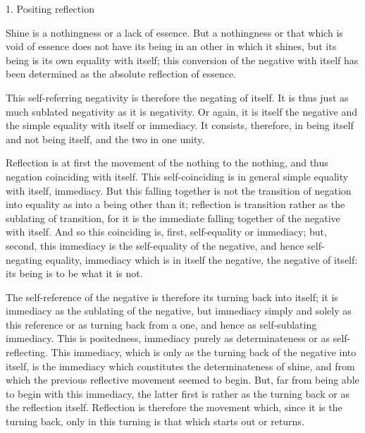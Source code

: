 1. Positing reflection

Shine is a nothingness or a lack of essence.
But a nothingness or that which is void of essence
does not have its being in an other in which it shines,
but its being is its own equality with itself;
this conversion of the negative with itself has been determined
as the absolute reflection of essence.

This self-referring negativity is therefore the negating of itself.
It is thus just as much sublated negativity as it is negativity.
Or again, it is itself the negative
and the simple equality with itself or immediacy.
It consists, therefore, in being itself and not being itself,
and the two in one unity.

Reflection is at first the movement of
the nothing to the nothing,
and thus negation coinciding with itself.
This self-coinciding is in general
simple equality with itself, immediacy.
But this falling together is not
the transition of negation into equality
as into a being other than it;
reflection is transition rather as the sublating of transition,
for it is the immediate falling together of the negative with itself.
And so this coinciding is, first, self-equality or immediacy;
but, second, this immediacy is the self-equality of the negative,
and hence self-negating equality,
immediacy which is in itself the negative, the negative of itself:
its being is to be what it is not.

The self-reference of the negative is
therefore its turning back into itself;
it is immediacy as the sublating of the negative,
but immediacy simply and solely as this reference
or as turning back from a one,
and hence as self-sublating immediacy.
This is positedness,
immediacy purely as determinateness
or as self-reflecting.
This immediacy, which is only as
the turning back of the negative into itself,
is the immediacy which constitutes the determinateness of shine,
and from which the previous reflective movement seemed to begin.
But, far from being able to begin with this immediacy,
the latter first is rather as the turning back
or as the reflection itself.
Reflection is therefore the movement which,
since it is the turning back,
only in this turning is that
which starts out or returns.

